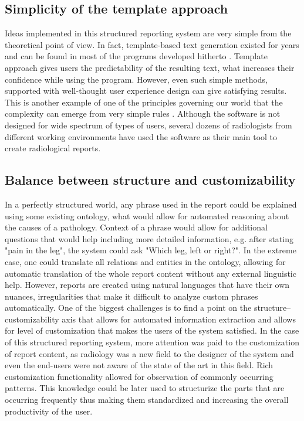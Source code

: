 \documentclass[12pt, twoside, openany]{report}
\theoremstyle{definition}
\begin{document}
\subsection{Simplicity of the template approach}
Ideas implemented in this structured reporting system are very simple from the theoretical point of view. In fact, template-based text generation existed for years and can be found in most of the programs developed hitherto \cite{nlg-templates}. Template approach gives users the predictability of the resulting text, what increases their confidence while using the program. However, even such simple methods, supported with well-thought user experience design can give satisfying results. This is another example of one of the principles governing our world that the complexity can emerge from very simple rules \cite{s-wolfram}. 
Although the software is not designed for wide spectrum of types of users, several dozens of radiologists from different working environments have used the software as their main tool to create radiological reports. 

\subsection{Balance between structure and customizability}
In a perfectly structured world, any phrase used in the report could be explained using some existing ontology, what would allow for automated reasoning about the causes of a pathology. Context of a phrase would allow for additional questions that would help including more detailed information, e.g. after stating "pain in the leg", the system could ask "Which leg, left or right?". In the extreme case, one could translate all relations and entities in the ontology, allowing for automatic translation of the whole report content without any external linguistic help. However, reports are created using natural languages that have their own nuances, irregularities that make it difficult to analyze custom phrases automatically. One of the biggest challenges is to find a point on the structure--customizability axis that allows for automated information extraction and allows for level of customization that makes the users of the system satisfied. In the case of this structured reporting system, more attention was paid to the customization of report content, as radiology was a new field to the designer of the system and even the end-users were not aware of the state of the art in this field. Rich customization functionality allowed for observation of commonly occurring patterns. This knowledge could be later used to structurize the parts that are occurring frequently thus making them standardized and increasing the overall productivity of the user.
\end{document}
